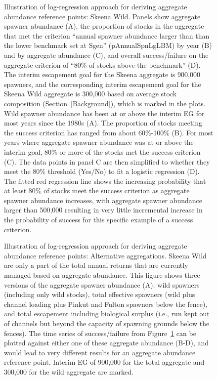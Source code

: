 \documentclass[french,11pt]{book}
\begin{document}
\begin{figure}[htb]

{\centering {} 

}

\caption{Illustration of log-regression approach for deriving aggregate abundance reference points: Skeena Wild. Panels show aggregate spawner abundance (A), the proportion of stocks in the aggregate that met the criterion ``annual spawner abundance larger than than the lower benchmark set at Sgen'' (pAnnualSpnLgLBM) by year (B) and by aggregate abundance (C), and overall success/failure on the aggregate criterion of ``80\% of stocks above the benchmark'' (D). The interim escapement goal for the Skeena aggregate is 900,000 spawners, and the corresponding interim escapement goal for the Skeena Wild aggregate is 300,000 based on average stock composition (Section~\ref{Background}), which is marked in the plots. Wild spawner abundance has been at or above the interim EG for most years since the 1980s (A). The proportion of stocks meeting the success criterion has ranged from about 60\%-100\% (B). For most years where aggregate spawner abundance was at or above the interim goal, 80\% or more of the stocks met the success criterion (C). The data points in panel C are then simplified to whether they meet the 80\% threshold (Yes/No) to fit a logistic regression (D). The fitted red regression line shows the increasing probability that at least 80\% of stocks meet the success criterion as aggregate spawner abundance increases, with aggregate spawner abundance larger than 500,000 resulting in very little incremental increase in the probability of success for this specific example of a success criterion.}\label{fig:LogRegSkeenaWild}
\end{figure}
\clearpage


\begin{figure}[htb]

{\centering {} 

}

\caption{Illustration of log-regression approach for deriving aggregate abundance reference points: Alternative aggregations. Skeena Wild are only a part of the total annual returns that are currently managed based on aggregate abundance. This figure shows three versions of the aggregate spawner abundance (A): wild spawners (including only wild stocks), total effective spawners (wild plus channel loading plus Pinkut and Fulton spawners below the fence), and total escapement including biological surplus (i.e., run kept out of channels but beyond the capacity of spawning grounds below the fences). The time series of success/failure from Figure~\ref{fig:LogRegSkeenaWild} can be plotted against either one of these aggregate abundance (B-D), and would lead to very different results for an aggregate abundance reference point. Interim EG of 900,000 for the total aggregate and 300,000 for the wild aggregate are marked.}\label{fig:LogRegSkeenaWild2}
\end{figure}
\clearpage
\end{document}
